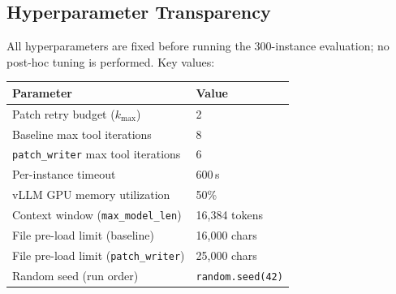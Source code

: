 \subsection{Hyperparameter Transparency}
\label{sec:exp:hyperparams}

All hyperparameters are fixed before running the 300-instance evaluation;
no post-hoc tuning is performed. Key values:

\begin{center}
\small
\begin{tabular}{ll}
\toprule
\textbf{Parameter} & \textbf{Value} \\
\midrule
Patch retry budget ($k_{\max}$) & 2 \\
Baseline max tool iterations    & 8 \\
\texttt{patch\_writer} max tool iterations & 6 \\
Per-instance timeout            & 600\,s \\
vLLM GPU memory utilization     & 50\% \\
Context window (\texttt{max\_model\_len}) & 16,384 tokens \\
File pre-load limit (baseline)  & 16,000 chars \\
File pre-load limit (\texttt{patch\_writer}) & 25,000 chars \\
Random seed (run order)         & \texttt{random.seed(42)} \\
\bottomrule
\end{tabular}
\end{center}
